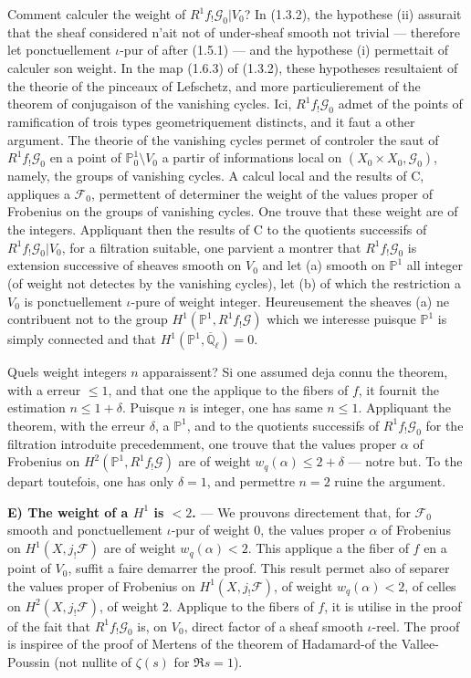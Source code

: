 \documentclass[12pt,a4paper]{article}
\theoremstyle{plain}
\theoremstyle{definition}
\theoremstyle{definition}
\theoremstyle{remark}
\begin{document}
Comment calculer the weight of $R^1 f_! \mathscr{G}_0|V_0$? In (1.3.2), the hypothese (ii) assurait that the sheaf considered n'ait not of under-sheaf smooth not trivial --- therefore let ponctuellement $\iota$-pur of after (1.5.1) --- and the hypothese (i) permettait of calculer son weight. In the map (1.6.3) of (1.3.2), these hypotheses resultaient of the theorie of the pinceaux of Lefschetz, and more particulierement of the theorem of conjugaison of the vanishing cycles. Ici, $R^1 f_! \mathscr{G}_0$ admet of the points of ramification of trois types geometriquement distincts, and it faut a other argument. The theorie of the vanishing cycles permet of controler the saut of $R^1 f_! \mathscr{G}_0$ en a point of $\mathbb{P}_0^1 \setminus V_0$ a partir of informations local on $(X_0 \times X_0, \mathscr{G}_0)$, namely, the groups of vanishing cycles. A calcul local and the results of C, appliques a $\mathscr{F}_0$, permettent of determiner the weight of the values proper of Frobenius on the groups of vanishing cycles. One trouve that these weight are of the integers. Appliquant then the results of C to the quotients successifs of $R^1 f_! \mathscr{G}_0|V_0$, for a filtration suitable, one parvient a montrer that $R^1 f_! \mathscr{G}_0$ is extension successive of sheaves smooth on $V_0$ and let (a) smooth on $\mathbb{P}^1$ all integer (of weight not detectes by the vanishing cycles), let (b) of which the restriction a $V_0$ is ponctuellement $\iota$-pure of weight integer. Heureusement the sheaves (a) ne contribuent not to the group $H^1(\mathbb{P}^1, R^1 f_! \mathscr{G})$ which we interesse puisque $\mathbb{P}^1$ is simply connected and that $H^1(\mathbb{P}^1, \overline{\mathbb{Q}}_\ell) = 0$.

Quels weight integers $n$ apparaissent? Si one assumed deja connu the theorem, with a erreur $\leq 1$, and that one the applique to the fibers of $f$, it fournit the estimation $n \leq 1+\delta$. Puisque $n$ is integer, one has same $n \leq 1$. Appliquant the theorem, with the erreur $\delta$, a $\mathbb{P}^1$, and to the quotients successifs of $R^1 f_! \mathscr{G}_0$ for the filtration introduite precedemment, one trouve that the values proper $\alpha$ of Frobenius on $H^2(\mathbb{P}^1, R^1 f_! \mathscr{G})$ are of weight $w_q(\alpha) \leq 2 + \delta$ --- notre but. To the depart toutefois, one has only $\delta = 1$, and permettre $n = 2$ ruine the argument.

\medskip
\textbf{E) The weight of a $H^1$ is $< 2$.} --- We prouvons directement that, for $\mathscr{F}_0$ smooth and ponctuellement $\iota$-pur of weight $0$, the values proper $\alpha$ of Frobenius on $H^1(X, j_! \mathscr{F})$ are of weight $w_q(\alpha) < 2$. This applique a the fiber of $f$ en a point of $V_0$, suffit a faire demarrer the proof. This result permet also of separer the values proper of Frobenius on $H^1(X, j_! \mathscr{F})$, of weight $w_q(\alpha) < 2$, of celles on $H^2(X, j_! \mathscr{F})$, of weight $2$. Applique to the fibers of $f$, it is utilise in the proof of the fait that $R^1 f_! \mathscr{G}_0$ is, on $V_0$, direct factor of a sheaf smooth $\iota$-reel. The proof is inspiree of the proof of Mertens of the theorem of Hadamard-of the Vallee-Poussin (not nullite of $\zeta(s)$ for $\Re s = 1$).
\end{document}
